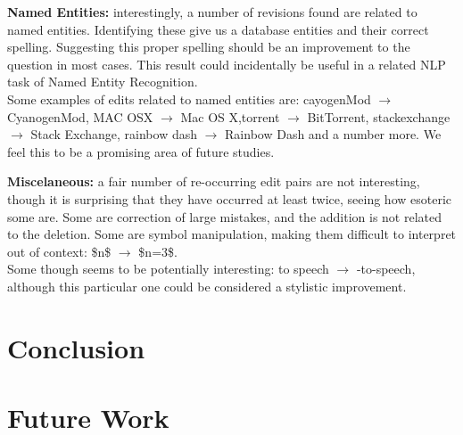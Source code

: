 \documentclass[11pt, oneside]{article}   	%
\begin{document}
{\bfseries Named Entities:} interestingly, a number of revisions found are related to named entities. Identifying these give us a database entities and their correct spelling. Suggesting this proper spelling should be an improvement to the question in most cases. This result could incidentally be useful in a related NLP task of Named Entity Recognition.\\
Some examples of edits related to named entities are: cayogenMod $\rightarrow$ CyanogenMod, MAC OSX $\rightarrow$ Mac OS X,torrent $\rightarrow$ BitTorrent, stackexchange $\rightarrow$ Stack Exchange, rainbow dash $\rightarrow$ Rainbow Dash and a number more. We feel this to be a promising area of future studies.

{\bfseries Miscelaneous:} a fair number of re-occurring edit pairs are not interesting, though it is surprising that they have occurred at least twice, seeing how esoteric some are. Some are correction of large mistakes, and the addition is not related to the deletion. Some are symbol manipulation, making them difficult to interpret out of context: \$n\$ $\rightarrow$ \$n=3\$.\\
Some though seems to be potentially interesting: to speech $\rightarrow$ -to-speech, although this particular one could be considered a stylistic improvement.


\section{Conclusion}
\section{Future Work}
\end{document}
